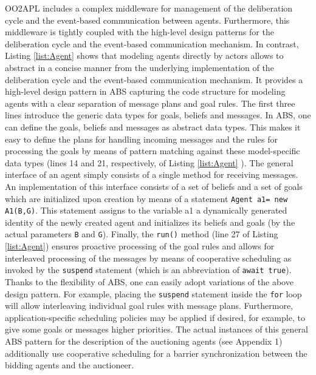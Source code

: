 OO2APL  includes a complex middleware for management of the deliberation cycle and the event-based communication between agents. 
Furthermore, this middleware is tightly coupled with the high-level design patterns for the deliberation cycle and  the event-based communication mechanism.
In contrast,  Listing \ref{list:Agent} shows that modeling agents directly by actors  allows to abstract in a concise manner from the underlying implementation of the deliberation cycle  and the event-based communication mechanism.
It provides  a high-level design pattern in ABS capturing the code structure for modeling agents with a clear separation of message plans and goal rules. 
The first three lines introduce the generic data types for goals, beliefs and messages.
In ABS, one can define the goals, beliefs and messages as abstract data types.
This makes it easy to define the plans for  handling incoming messages and the rules for processing the goals by means of pattern matching against these model-specific data types (lines 14 and 21, respectively, of Listing \ref{list:Agent} ).
The general interface of an agent simply consists of a single method for receiving  messages. An  implementation of this interface consists of a set of beliefs and a set of goals which are initialized upon creation by means of a statement
\lstinline|Agent a1= new A1(B,G)|.
This statement  assigns to the variable a1 a dynamically generated  identity of the newly created agent and initializes its beliefs and goals (by  the actual parameters \lstinline|B| and \lstinline|G|).
Finally,  the \lstinline|run()| method (line 27 of  Listing \ref{list:Agent}) ensures proactive processing of the goal rules and allows for
interleaved processing of the messages by means of cooperative scheduling as invoked by the \lstinline|suspend| statement (which is an abbreviation of \lstinline|await true|).
Thanks to the flexibility of ABS, one can easily adopt variations of the above design pattern.
For example, placing the \lstinline|suspend| statement inside the \lstinline|for| loop will allow interleaving individual goal rules with message plans.
Furthermore, application-specific scheduling policies \cite{rabs,cog}  may be applied if desired, for example, to give some goals or messages higher priorities.
The actual  instances of  this general  ABS pattern for the description of the auctioning agents (see  Appendix 1) additionally use cooperative scheduling for a barrier synchronization between the bidding agents
and the auctioneer. 



